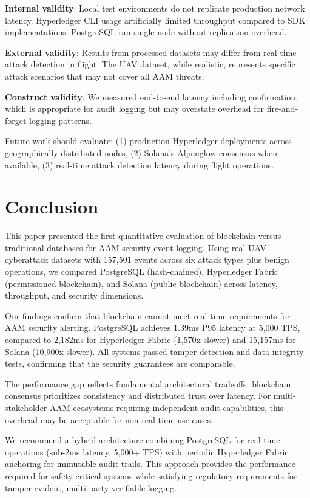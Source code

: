 \documentclass[conference]{IEEEtran}
\begin{document}
\textbf{Internal validity}: Local test environments do not replicate production network latency. Hyperledger CLI usage artificially limited throughput compared to SDK implementations. PostgreSQL ran single-node without replication overhead.

\textbf{External validity}: Results from processed datasets may differ from real-time attack detection in flight. The UAV dataset, while realistic, represents specific attack scenarios that may not cover all AAM threats.

\textbf{Construct validity}: We measured end-to-end latency including confirmation, which is appropriate for audit logging but may overstate overhead for fire-and-forget logging patterns.

Future work should evaluate: (1) production Hyperledger deployments across geographically distributed nodes, (2) Solana's Alpenglow consensus when available, (3) real-time attack detection latency during flight operations.

\section{Conclusion}
\label{sec:conclusion}

This paper presented the first quantitative evaluation of blockchain versus traditional databases for AAM security event logging. Using real UAV cyberattack datasets with 157,501 events across six attack types plus benign operations, we compared PostgreSQL (hash-chained), Hyperledger Fabric (permissioned blockchain), and Solana (public blockchain) across latency, throughput, and security dimensions.

Our findings confirm that blockchain cannot meet real-time requirements for AAM security alerting. PostgreSQL achieves 1.39ms P95 latency at 5,000 TPS, compared to 2,182ms for Hyperledger Fabric (1,570x slower) and 15,157ms for Solana (10,900x slower). All systems passed tamper detection and data integrity tests, confirming that the security guarantees are comparable.

The performance gap reflects fundamental architectural tradeoffs: blockchain consensus prioritizes consistency and distributed trust over latency. For multi-stakeholder AAM ecosystems requiring independent audit capabilities, this overhead may be acceptable for non-real-time use cases.

We recommend a hybrid architecture combining PostgreSQL for real-time operations (sub-2ms latency, 5,000+ TPS) with periodic Hyperledger Fabric anchoring for immutable audit trails. This approach provides the performance required for safety-critical systems while satisfying regulatory requirements for tamper-evident, multi-party verifiable logging.
\end{document}

